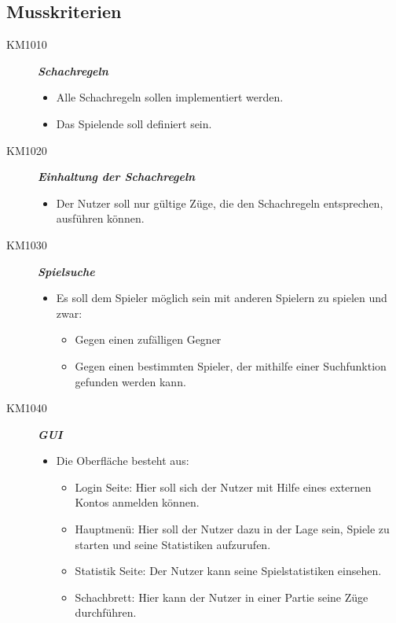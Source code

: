 \documentclass[parskip=full]{scrartcl}
\begin{document}
\subsection{Musskriterien}
\begin{description}
\item[KM1010] \textbf{\textit{\gls{Schachregeln}}}
\begin{itemize}
	\item Alle \gls{Schachregeln} sollen implementiert werden.
	\item Das Spielende soll definiert sein.	
\end{itemize}
\item[KM1020] \textbf{\textit{Einhaltung der \gls{Schachregeln}}}
\begin{itemize}
	\item Der Nutzer soll nur gültige Züge, die den \gls{Schachregeln} entsprechen, ausführen können.
\end{itemize}
\item[KM1030] \textbf{\textit{Spielsuche}}
\begin{itemize}
	\item Es soll dem Spieler möglich sein mit anderen Spielern zu spielen und zwar:
	\begin{itemize}
		\item Gegen einen zufälligen Gegner
		\item Gegen einen bestimmten Spieler, der mithilfe einer Suchfunktion gefunden werden kann.
	\end{itemize}
\end{itemize}
\item[KM1040] \textbf{\textit{\gls{GUI}}}
\begin{itemize}
	\item Die Oberfläche besteht aus:
	\begin{itemize}		
		\item Login Seite: Hier soll sich der Nutzer mit Hilfe eines externen Kontos anmelden können.
		
		\item Hauptmenü: Hier soll der Nutzer dazu in der Lage sein, Spiele zu starten und seine Statistiken aufzurufen.
		
		\item Statistik Seite: Der Nutzer kann seine Spielstatistiken einsehen.
		
		\item Schachbrett: Hier kann der Nutzer in einer Partie seine Züge durchführen.
		

\end{itemize}
\end{itemize}
\end{description}
\end{document}
